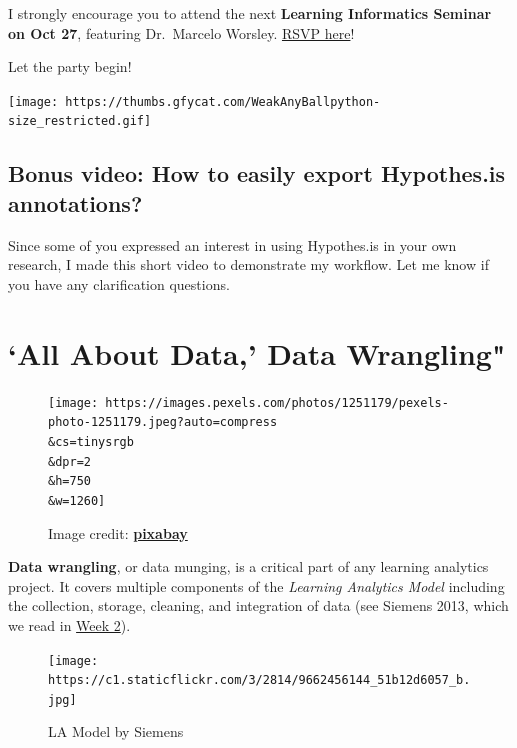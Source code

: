 \documentclass[
]{book}
\begin{document}
I strongly encourage you to attend the next \textbf{Learning Informatics Seminar on Oct 27}, featuring Dr.~Marcelo Worsley. \href{https://umn.zoom.us/webinar/register/WN_S6aW-qPcQDS-v-XihTNf_A}{RSVP here}!

Let the party begin!

\texttt{[image: https://thumbs.gfycat.com/WeakAnyBallpython-size\_restricted.gif]}

\hypertarget{bonus-video-how-to-easily-export-hypothes.is-annotations}{%
\section{Bonus video: How to easily export Hypothes.is annotations?}\label{bonus-video-how-to-easily-export-hypothes.is-annotations}}

Since some of you expressed an interest in using Hypothes.is in your own research, I made this short video to demonstrate my workflow. Let me know if you have any clarification questions.

\hypertarget{all-about-data-data-wrangling}{%
\chapter{`All About Data,' Data Wrangling"}\label{all-about-data-data-wrangling}}

\begin{figure}
\centering
\texttt{[image: https://images.pexels.com/photos/1251179/pexels-photo-1251179.jpeg?auto=compress\\\&cs=tinysrgb\\\&dpr=2\\\&h=750\\\&w=1260]}
\caption{Image credit: \href{https://www.pexels.com/photo/person-flattening-dough-with-rolling-pin-1251179/}{\textbf{pixabay}}}
\end{figure}

\textbf{Data wrangling}, or data munging, is a critical part of any learning analytics project. It covers multiple components of the \emph{Learning Analytics Model} including the collection, storage, cleaning, and integration of data (see Siemens 2013, which we read in \href{_book/learning-analytics-a-brief-overview.html}{Week 2}).

\begin{figure}
\centering
\texttt{[image: https://c1.staticflickr.com/3/2814/9662456144\_51b12d6057\_b.jpg]}
\caption{LA Model by Siemens}
\end{figure}
\end{document}
